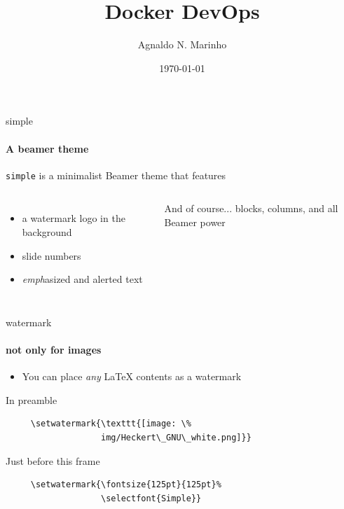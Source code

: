\documentclass{beamer}
\title{Docker DevOps}
\subtitle{}
\date{\today}
\author{Agnaldo N. Marinho}
\institute{\url{http://github.com/agnaldom}}
\begin{document}
\maketitle

\begin{frame}{simple}
  \framesubtitle{A beamer theme}

  \texttt{simple} is a minimalist Beamer theme that features

  \begin{columns}
      \begin{itemize}
        \item a \alert{watermark} logo in the background
        \item slide \alert{numbers}
        \item \emph{emph}asized and \alert{alert}ed text
      \end{itemize}

      \begin{block}{And of course...}
         blocks, columns, and all Beamer power
      \end{block}
  \end{columns}
  
\end{frame}



\setwatermark{\fontsize{125pt}{125pt}\selectfont{Simple}}

\begin{frame}[fragile]{watermark}
  \framesubtitle{not only for images}

  \begin{itemize}
    \item You can place \emph{any} \LaTeX{} \alert{contents} as a watermark
  \end{itemize}

  \begin{block}{In preamble}
    \begin{verbatim}
     \setwatermark{\texttt{[image: \%
                   img/Heckert\_GNU\_white.png]}}
    \end{verbatim}
  \end{block}

  \begin{block}{Just before this frame}
    \begin{verbatim}
     \setwatermark{\fontsize{125pt}{125pt}%
                   \selectfont{Simple}}
    \end{verbatim}
  \end{block}


\end{frame}
\end{document}
